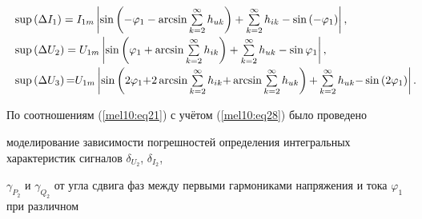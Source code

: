 \begin{equation}

\label{mel10:eq28}

\begin{array}{l}

\sup \left( \Delta I_1 \right)=I_{1m} \left| \sin \left( -\varphi_1

- \arcsin \sum \limits_{k=2}^\infty h_{uk} \right)+ \sum \limits_{k=2}^\infty h_{ik} - \sin \left( -\varphi _1

\right) \right|, \vspace{1mm} \\


\sup \left( \Delta U_2 \right)=U_{1m} \left| \sin \left( \varphi_1

+ \arcsin \sum\limits_{k=2}^\infty h_{ik} \right)+\sum\limits_{k=2}^\infty h_{uk} - \sin \varphi_1 \right|, \vspace{1mm} \\




\sup \left( \Delta U_3  \right){=}U_{1m} 



\left| \sin \left( 2\varphi _1

{+}2 \arcsin \sum \limits_{k=2}^\infty h_{ik}{+}\arcsin

\sum \limits_{k=2}^\infty h_{uk} \right){+}\sum\limits_{k=2}^\infty

h_{uk}{-}\sin \left( 2\varphi_1 \right)\right|. \hspace{-5mm}

\end{array}

\end{equation}





По соотношениям (\ref{mel10:eq21}) с уч\"етом (\ref{mel10:eq28}) было проведено

моделирование зависимости погрешностей определения интегральных характеристик сигналов $\delta_{U_2}$, $\delta_{I_2}$,

$\gamma_{P_2}$ и $\gamma_{Q_2}$ от угла сдвига фаз между первыми гармониками напряжения и тока $\varphi_{1}$ при различном


